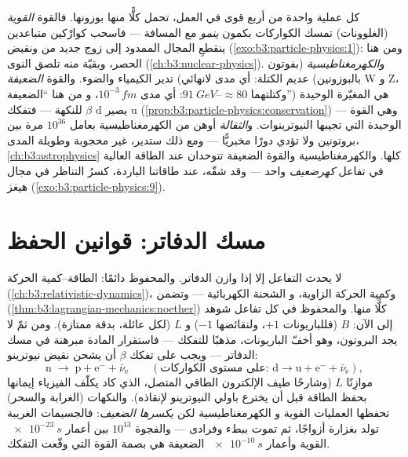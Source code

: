 \begin{remark}\label{rem:b3:particle-physics:forces}
كل عملية واحدة من أربع قوى في العمل، تحمل كلًّا منها
بوزونها. فالقوة \emph{القوية} (الغلوونات) تمسك الكواركات
بكمون \emph{ينمو} مع المسافة --- فاسحب كوارْكين
متباعدين ينقطعِ المجال الممدود إلى زوج جديد من
 ونقيض  (\cref{exo:b3:particle-physics:1}): ومن هنا
الحصر، وبقيّة منه تلصق النوى
(\cref{ch:b3:nuclear-physics}). و\emph{الكهرمغناطيسية} (بفوتون
عديم الكتلة: أي مدى لانهائي) تدير الكيمياء والضوء. والقوة
\emph{الضعيفة} (بالبوزونين W و Z، وكتلتهما
$\approx80$--$\qty{91}{GeV}$: أي مدى $10^{-3}\,\unit{fm}$، و
من هنا ``الضعيفة'') هي المغيّرة الوحيدة للنكهة --- فتفكك $\beta$
 d يصير u
(\cref{prop:b3:particle-physics:conservation}) --- وهي القوة
الوحيدة التي تجيبها النيوترينوات. و\emph{الثقالة} أوهن من
الكهرمغناطيسية بعامل $10^{36}$ مرة بين بروتونين ولا تؤدي دورًا
مخبريًّا --- ومع ذلك ستدير، غير محجوبة وطويلة المدى،
\cref{ch:b3:astrophysics} كلها. والكهرمغناطيسية والقوة
الضعيفة تتوحدان عند الطاقة العالية في تفاعل \emph{كهرضعيف}
واحد --- وقد شقّه، عند طاقاتنا الباردة، كسرُ التناظر
في مجال هيغز (\cref{exo:b3:particle-physics:9}).
\end{remark}

\section{مسك الدفاتر: قوانين الحفظ}

\begin{proposition}\label{prop:b3:particle-physics:conservation}
لا يحدث التفاعل إلا إذا وازن الدفاتر. والمحفوظ دائمًا:
الطاقة--كمية الحركة
(\cref{ch:b3:relativistic-dynamics})، وكمية الحركة الزاوية، و
الشحنة الكهربائية --- وتضمن 
(\cref{thm:b3:lagrangian-mechanics:noether}) كلًّا منها.
والمحفوظ في كل تفاعل شوهد إلى الآن: \emph{}
$B$ (فللباريونات $+1$، ولنقائضها $-1$) و\emph{}
$L$ (لكل عائلة، بدقة ممتازة). ومن ثمّ لا يجد البروتون، وهو
أخفّ الباريونات، مذهبًا للتفكك --- فاستقرار المادة
مبرهنة في مسك الدفاتر --- ويجب على تفكك $\beta$ أن يشحن
نقيض نيوترينو:
\[
\text{n} \;\to\; \text{p} + \text{e}^- + \bar\nu_{\text{e}}
\qquad (\text{على مستوى الكواركات: } \text{d} \to \text{u} +
\text{e}^- + \bar\nu_{\text{e}}) ,
\]
موازِنًا $L$ (وشارحًا طيف الإلكترون الطاقي
المتصل، الذي كاد يكلّف الفيزياء إيمانها بحفظ
الطاقة قبل أن يخترع باولي النيوترينو لإنقاذه).
والنكهات (الغرابة والسحر) تحفظها العمليات القوية و
الكهرمغناطيسية لكن \emph{يكسرها الضعيف}: فالجسيمات
الغريبة تولد بغزارة أزواجًا، ثم تموت ببطء وفرادى
--- والفجوة $10^{13}$ بين أعمار $\qty{e-23}{s}$ القوية
وأعمار $\qty{e-10}{s}$ الضعيفة هي بصمة القوة التي
وقّعت التفكك.
\end{proposition}
\admitted

